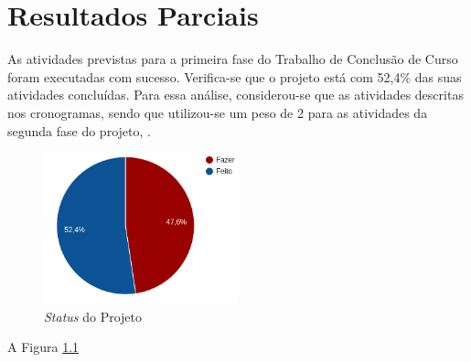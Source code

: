 \chapter[Resultados Parciais]{Resultados Parciais}





As atividades previstas para a primeira fase do Trabalho de Conclusão de Curso foram executadas com sucesso. Verifica-se que o projeto está com 52,4\%  das suas atividades concluídas. Para essa análise, considerou-se que as atividades descritas nos cronogramas, sendo que utilizou-se um peso de 2 para as atividades da segunda fase do projeto, .

 \begin{figure}[h]
    \centering
    \includegraphics[width=0.5\textwidth]{figuras/pizzadobro.png}
    \caption{ \textit{Status} do Projeto}
    \label{fig:resultados}
 \end{figure}

A Figura  \ref{fig:resultados}